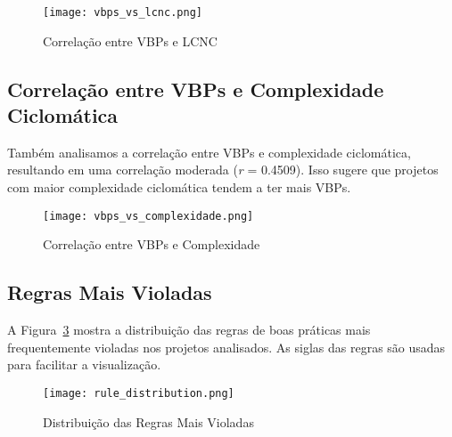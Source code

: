\documentclass[12pt]{article}
\begin{document}
\begin{figure}[H]
\centering
\texttt{[image: vbps\_vs\_lcnc.png]}
\caption{Correlação entre VBPs e LCNC}
\label{fig:vbps_vs_lcnc}
\end{figure}

\subsection{Correlação entre VBPs e Complexidade Ciclomática}
Também analisamos a correlação entre VBPs e complexidade ciclomática, resultando em uma correlação moderada (\textit{r} = 0.4509). Isso sugere que projetos com maior complexidade ciclomática tendem a ter mais VBPs.
\begin{figure}[H]
\centering
\texttt{[image: vbps\_vs\_complexidade.png]}
\caption{Correlação entre VBPs e Complexidade}
\label{fig:vbps_vs_complexidade}
\end{figure}

\subsection{Regras Mais Violadas}
A Figura~\ref{fig:rule_distribution} mostra a distribuição das regras de boas práticas mais frequentemente violadas nos projetos analisados. As siglas das regras são usadas para facilitar a visualização.

\begin{figure}[H]
\centering
\texttt{[image: rule\_distribution.png]}
\caption{Distribuição das Regras Mais Violadas}
\label{fig:rule_distribution}
\end{figure}

\end{document}
